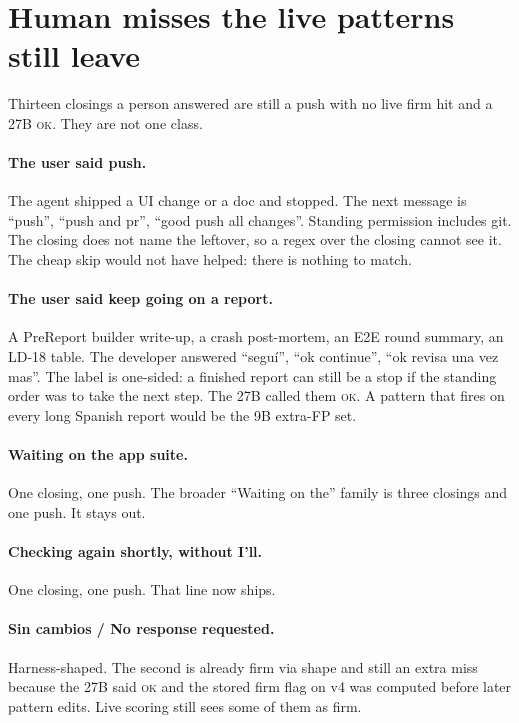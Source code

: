 \section{Human misses the live patterns still leave}
\label{app:stillmiss}

Thirteen closings a person answered are still a push with no live
firm hit and a 27B \textsc{ok}. They are not one class.

\paragraph{The user said push.} The agent shipped a UI change or a
doc and stopped. The next message is ``push'', ``push and pr'',
``good push all changes''. Standing permission includes git. The
closing does not name the leftover, so a regex over the closing
cannot see it. The cheap skip would not have helped: there is
nothing to match.

\paragraph{The user said keep going on a report.} A PreReport
builder write-up, a crash post-mortem, an E2E round summary, an
LD-18 table. The developer answered ``seguí'', ``ok continue'',
``ok revisa una vez mas''. The label is one-sided: a finished
report can still be a stop if the standing order was to take the
next step. The 27B called them \textsc{ok}. A pattern that fires
on every long Spanish report would be the 9B extra-FP set.

\paragraph{Waiting on the app suite.} One closing, one push. The
broader ``Waiting on the'' family is three closings and one push.
It stays out.

\paragraph{Checking again shortly, without I'll.} One closing, one
push. That line now ships.

\paragraph{Sin cambios / No response requested.} Harness-shaped.
The second is already firm via shape and still an extra miss
because the 27B said \textsc{ok} and the stored firm flag on v4
was computed before later pattern edits. Live scoring still sees
some of them as firm.

